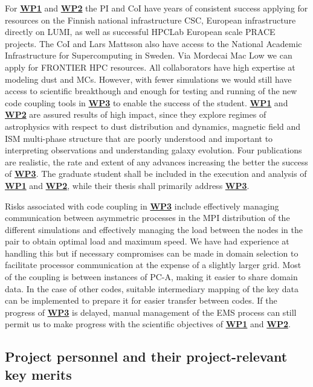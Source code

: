\documentclass[a4paper,12pt]{article}
\newcommand{\wpref}[1]{\protect\hyperlink{wp#1}{\textbf{WP#1}}}
\begin{document}
For \wpref{1} and \wpref{2} the PI and CoI have years of consistent success applying for resources on
the Finnish national infrastructure CSC, European infrastructure directly on
LUMI, as well as successful HPCLab European scale PRACE projects.  The CoI and
Lars Mattsson also have access to the National Academic
Infrastructure for Supercomputing in Sweden. Via Mordecai Mac Low we can apply for FRONTIER HPC resources.  
All collaborators have high expertise at modeling dust and MCs.  However,
with fewer simulations we would still have access to scientific breakthough and enough for testing and running of the new code
coupling tools in \wpref{3} to enable the success of the student.
\wpref{1} and \wpref{2} are assured results of high impact, since they explore
regimes of astrophysics with respect to dust distribution and dynamics,
magnetic field and ISM multi-phase structure that are poorly understood and
important to interpreting observations and understanding galaxy evolution.
Four publications are realistic, the rate and extent of any advances increasing
the better the success of \wpref{3}.  The graduate student shall be included in
the execution and analysis of \wpref{1} and \wpref{2}, while their thesis shall
primarily address \wpref{3}.

Risks associated with code coupling in \wpref{3} include effectively
managing communication between asymmetric processes in the MPI distribution of
the different simulations and effectively managing the load between the nodes
in the pair to obtain optimal load and maximum speed.  We have had
experience at handling this but if necessary compromises can
be made in domain selection to facilitate processor communication at the
expense of a slightly larger grid.  Most of the coupling is between instances
of PC-A, making it easier to share domain data.  In the case of other codes,
suitable intermediary mapping of the key data can be implemented to prepare it
for easier transfer between codes.  If the progress of \wpref{3} is delayed,
manual management of the EMS process can still permit us to make progress with
the scientific objectives of \wpref{1} and \wpref{2}.

\subsection{Project personnel and their project-relevant key merits}
\end{document}
